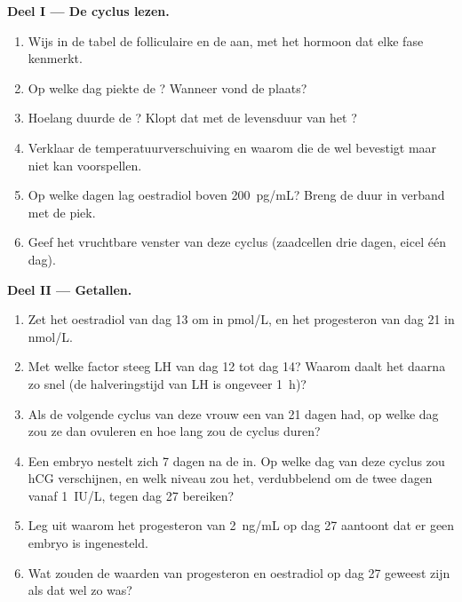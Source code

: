 \begin{problem}
\medskip
\noindent\textbf{Deel I --- De cyclus lezen.}
\begin{enumerate}
  \item Wijs in de tabel de folliculaire en de  aan, met het
        hormoon dat elke fase kenmerkt.
  \item Op welke dag piekte de ? Wanneer vond de  plaats?
  \item Hoelang duurde de ? Klopt dat met de levensduur van het
        ?
  \item Verklaar de temperatuurverschuiving en waarom die de  wel
        bevestigt maar niet kan voorspellen.
  \item Op welke dagen lag oestradiol boven \qty{200}{pg/mL}? Breng de duur
        in verband met de piek.
  \item Geef het vruchtbare venster van deze cyclus (zaadcellen drie dagen,
        eicel één dag).
\end{enumerate}

\medskip
\noindent\textbf{Deel II --- Getallen.}
\begin{enumerate}[resume]
  \item Zet het oestradiol van dag 13 om in \unit{pmol/L}, en het
        progesteron van dag 21 in \unit{nmol/L}.
  \item Met welke factor steeg LH van dag 12 tot dag 14? Waarom daalt het
        daarna zo snel (de halveringstijd van LH is ongeveer
        \qty{1}{h})?
  \item Als de volgende cyclus van deze vrouw een  van 21
        dagen had, op welke dag zou ze dan ovuleren en hoe lang zou de
        cyclus duren?
  \item Een embryo nestelt zich 7 dagen na de  in. Op welke dag van
        deze cyclus zou hCG verschijnen, en welk niveau zou het, verdubbelend
        om de twee dagen vanaf \qty{1}{IU/L}, tegen dag 27 bereiken?
  \item Leg uit waarom het progesteron van \qty{2}{ng/mL} op dag 27 aantoont
        dat er geen embryo is ingenesteld.
  \item Wat zouden de waarden van progesteron en oestradiol op dag 27
        geweest zijn als dat wel zo was?
\end{enumerate}


\end{problem}
